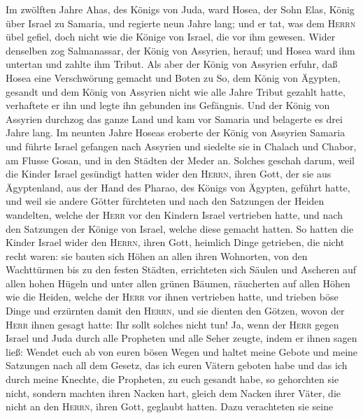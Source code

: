  Im zwölften Jahre Ahas, des Königs von Juda, ward Hosea,
der Sohn Elas, König über Israel zu Samaria, und regierte neun Jahre
lang;  und er tat, was dem \textsc{Herrn} übel gefiel,
doch nicht wie die Könige von Israel, die vor ihm gewesen.
 Wider denselben zog Salmanassar, der König von Assyrien,
herauf; und Hosea ward ihm untertan und zahlte ihm Tribut.
 Als aber der König von Assyrien erfuhr, daß Hosea eine
Verschwörung gemacht und Boten zu So, dem König von Ägypten, gesandt und
dem König von Assyrien nicht wie alle Jahre Tribut gezahlt hatte,
verhaftete er ihn und legte ihn gebunden ins Gefängnis. 
Und der König von Assyrien durchzog das ganze Land und kam vor Samaria
und belagerte es drei Jahre lang.  Im neunten Jahre Hoseas
eroberte der König von Assyrien Samaria und führte Israel gefangen nach
Assyrien und siedelte sie in Chalach und Chabor, am Flusse Gosan, und in
den Städten der Meder an.  Solches geschah darum, weil die
Kinder Israel gesündigt hatten wider den \textsc{Herrn}, ihren Gott, der
sie aus Ägyptenland, aus der Hand des Pharao, des Königs von Ägypten,
geführt hatte, und weil sie andere Götter fürchteten  und
nach den Satzungen der Heiden wandelten, welche der \textsc{Herr} vor
den Kindern Israel vertrieben hatte, und nach den Satzungen der Könige
von Israel, welche diese gemacht hatten.  So hatten die
Kinder Israel wider den \textsc{Herrn}, ihren Gott, heimlich Dinge
getrieben, die nicht recht waren: sie bauten sich Höhen an allen ihren
Wohnorten, von den Wachttürmen bis zu den festen Städten,
 errichteten sich Säulen und Ascheren auf allen hohen
Hügeln und unter allen grünen Bäumen,  räucherten auf
allen Höhen wie die Heiden, welche der \textsc{Herr} vor ihnen
vertrieben hatte, und trieben böse Dinge und erzürnten damit den
\textsc{Herrn},  und sie dienten den Götzen, wovon der
\textsc{Herr} ihnen gesagt hatte: Ihr sollt solches nicht tun!
 Ja, wenn der \textsc{Herr} gegen Israel und Juda durch
alle Propheten und alle Seher zeugte, indem er ihnen sagen ließ: Wendet
euch ab von euren bösen Wegen und haltet meine Gebote und meine
Satzungen nach all dem Gesetz, das ich euren Vätern geboten habe und das
ich durch meine Knechte, die Propheten, zu euch gesandt habe,
 so gehorchten sie nicht, sondern machten ihren Nacken
hart, gleich dem Nacken ihrer Väter, die nicht an den \textsc{Herrn},
ihren Gott, geglaubt hatten.  Dazu verachteten sie seine
